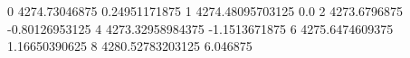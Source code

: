 0 4274.73046875 0.24951171875
1 4274.48095703125 0.0
2 4273.6796875 -0.80126953125
4 4273.32958984375 -1.1513671875
6 4275.6474609375 1.16650390625
8 4280.52783203125 6.046875
